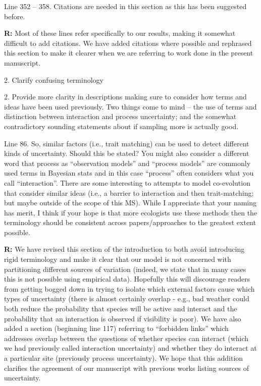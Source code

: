 \documentclass[12pt]{letter}
\newenvironment{refquote}{\bigskip \begin{it}}{\end{it}\smallskip}
\begin{document}
		\begin{refquote}
		Line 352 – 358.  Citations are needed in this section as this has been suggested before.
		\end{refquote}


		\textbf{R:} Most of these lines refer specifically to our results, making it somewhat difficult to add citations. We have added citations where possible and rephrased this section to make it clearer when we are referring to work done in the present manuscript.


	2. Clarify confusing terminology

		\begin{refquote}
		2.      Provide more clarity in descriptions making sure to consider how terms and ideas have been used previously.  Two things come to mind – the use of terms and distinction between interaction and process uncertainty; and the somewhat contradictory sounding statements about if sampling more is actually good.


		Line 86.  So, similar factors (i.e., trait matching) can be used to detect different kinds of uncertainty.  Should this be stated?  You might also consider a different word that process as ``observation models'' and ``process models'' are commonly used terms in Bayesian stats and in this case ``process'' often considers what you call ``interaction''.  There are some interesting to attempts to model co-evolution that consider similar ideas (i.e., a barrier to interaction and then trait-matching; but maybe outside of the scope of this MS). While I appreciate that your naming has merit, I think if your hope is that more ecologists use these methods then the terminology should be consistent across papers/approaches to the greatest extent possible.
		\end{refquote}


		\textbf{R:} We have revised this section of the introduction to both avoid introducing rigid terminology and make it clear that our model is not concerned with partitioning different sources of variation (indeed, we state that in many cases this is not possible using empirical data). Hopefully this will discourage readers from getting bogged down in trying to isolate which external factors cause which types of uncertainty (there is almost certainly overlap - e.g., bad weather could both reduce the probability that species will be active and interact and the probability that an interaction is observed if visibility is poor). We have also added a section (beginning line 117) referring to ``forbidden links'' which addresses overlap between the questions of whether species can interact (which we had previously called interaction uncertainty) and whether they do interact at a particular site (previously process uncertainty). We hope that this addition clarifies the agreement of our manuscript with previous works listing sources of uncertainty.
\end{document}
